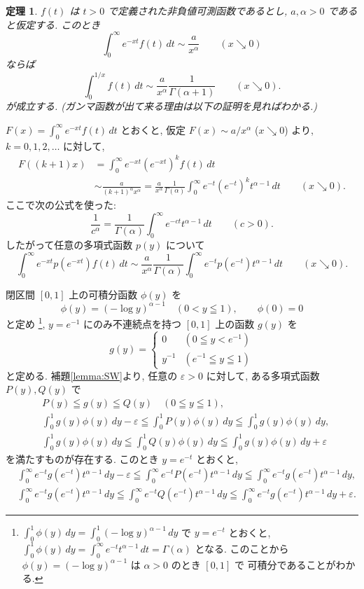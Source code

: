 \documentclass[12pt,twoside]{jarticle}
\makeatletter
\newcommand\eps{\varepsilon}
\theoremstyle{jplain}
\newtheorem{theorem}{定理}
\theoremstyle{jplain}
\theoremstyle{jplain}
\numberwithin{theorem}{section}
\numberwithin{equation}{section}
\numberwithin{figure}{section}
\numberwithin{table}{section}
\newcommand\lemmaref[1]{補題\ref{#1}}
\renewenvironment{proof}[1][\proofname]{\par
  \normalfont
  \topsep6\p@\@plus6\p@ \trivlist
  \item[\hskip\labelsep{\bfseries #1}\@addpunct{\bfseries.}]\ignorespaces
}{%
  \endtrivlist
}
\renewcommand{\proofname}{証明}
\makeatother
\begin{document}
\begin{theorem}
\label{theorem:Tauber-Laplace}
$f(t)$ は $t>0$ で定義された非負値可測函数であるとし,
$a,\alpha>0$ であると仮定する. このとき
\[
\int_0^\infty e^{-xt}f(t)\,dt \sim \frac{a}{x^\alpha}
\qquad (x\searrow 0)
\]
ならば
\[
\int_0^{1/x} f(t)\,dt \sim \frac{a}{x^\alpha}\frac{1}{\Gamma(\alpha+1)}
\qquad (x\searrow 0).
\]
が成立する.  (ガンマ函数が出て来る理由は以下の証明を見ればわかる.)
\end{theorem}

\begin{proof}
$F(x)=\int_0^\infty e^{-xt}f(t)\,dt$ とおくと, 
仮定 $F(x)\sim a/x^\alpha$ ($x\searrow 0$) より, $k=0,1,2,\ldots$ に対して, 
\begin{align*}
F((k+1)x)&=
\int_0^\infty e^{-xt}\left(e^{-xt}\right)^k f(t)\,dt
\\ &
\sim \frac{a}{(k+1)^\alpha x^\alpha}
=\frac{a}{x^\alpha}\frac{1}{\Gamma(\alpha)}
\int_0^\infty e^{-t}\left(e^{-t}\right)^k t^{\alpha-1}\,dt
\qquad(x\searrow 0).
\end{align*}
ここで次の公式を使った:
\[
\frac{1}{c^\alpha} = \frac{1}{\Gamma(\alpha)}\int_0^\infty e^{-ct} t^{\alpha-1}\,dt
\qquad (c>0).
\]
したがって任意の多項式函数 $p(y)$ について
\[
\int_0^\infty e^{-xt}p(e^{-xt})f(t)\,dt
\sim
\frac{a}{x^\alpha}\frac{1}{\Gamma(\alpha)}\int_0^\infty e^{-t}p(e^{-t})t^{\alpha-1}\,dt
\qquad(x\searrow 0).
\]

閉区間 $[0,1]$ 上の可積分函数 $\phi(y)$ を
\[
\phi(y)=(-\log y)^{\alpha-1}\quad (0<y\leqq 1), \qquad
\phi(0)=0
\]
と定め%
\footnote{$\int_0^1\phi(y)\,dy=\int_0^1(-\log y)^{\alpha-1}\,dy$
で $y=e^{-t}$ とおくと, 
$\int_0^1\phi(y)\,dy=\int_0^\infty e^{-t} t^{\alpha-1}\,dt=\Gamma(\alpha)$
となる. このことから $\phi(y)=(-\log y)^{\alpha-1}$ は $\alpha>0$ のとき $[0,1]$ で
可積分であることがわかる.
}, %
$y=e^{-1}$ にのみ不連続点を持つ $[0,1]$ 上の函数 $g(y)$ を
\[
g(y) =
\begin{cases}
0      & (0\leqq y<e^{-1}) \\
y^{-1} & (e^{-1}\leqq y\leqq 1)
\end{cases}
\]
と定める. 
\lemmaref{lemma:SW}より, 任意の $\eps>0$ に対して, 
ある多項式函数 $P(y),Q(y)$ で
\begin{align*}
&
P(y)\leqq g(y)\leqq Q(y) \quad (0\leqq y\leqq 1), 
\\ &
\int_0^1 g(y)\phi(y)\,dy-\eps
\leqq
\int_0^1 P(y)\phi(y)\,dy
\leqq
\int_0^1 g(y)\phi(y)\,dy,
\\ &
\int_0^1 g(y)\phi(y)\,dy
\leqq
\int_0^1 Q(y)\phi(y)\,dy
\leqq
\int_0^1 g(y)\phi(y)\,dy+\eps
\end{align*}
を満たすものが存在する.  このとき $y=e^{-t}$ とおくと, 
\begin{align*}
&
\int_0^\infty e^{-t}g(e^{-t})t^{\alpha-1}\,dy-\eps
\leqq
\int_0^\infty e^{-t}P(e^{-t})t^{\alpha-1}\,dy
\leqq
\int_0^\infty e^{-t}g(e^{-t})t^{\alpha-1}\,dy,
\\ &
\int_0^\infty e^{-t}g(e^{-t})t^{\alpha-1}\,dy
\leqq
\int_0^\infty e^{-t}Q(e^{-t})t^{\alpha-1}\,dy
\leqq
\int_0^\infty e^{-t}g(e^{-t})t^{\alpha-1}\,dy+\eps.
\end{align*}


\end{proof}
\end{document}
